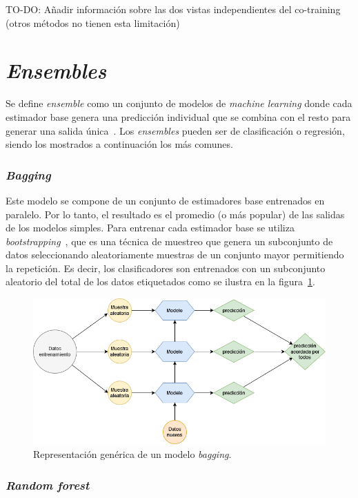 TO-DO: Añadir información sobre las dos vistas independientes del co-training (otros métodos no tienen esta limitación)


\section{\textit{Ensembles}}

Se define \textit{ensemble} como un conjunto de modelos de \textit{machine learning} donde cada estimador base genera una predicción individual que se combina con el resto para generar una salida única~\cite{originalCoForest2007}. Los \textit{ensembles} pueden ser de clasificación o regresión, siendo los mostrados a continuación los más comunes.
	
\subsubsection{\textit{Bagging}}

Este modelo se compone de un conjunto de estimadores base entrenados en paralelo. Por lo tanto, el resultado es el promedio (o más popular) de las salidas de los modelos simples. Para entrenar cada estimador base se utiliza \textit{bootstrapping}~\cite{engelen2018thesis}, que es una técnica de muestreo que genera un subconjunto de datos seleccionando aleatoriamente muestras de un conjunto mayor permitiendo la repetición. Es decir, los clasificadores son entrenados con un subconjunto aleatorio del total de los datos etiquetados como se ilustra en la figura~\ref{img:bagging}.

\begin{figure}[h]
	\caption{Representación genérica de un modelo \textit{bagging}.}
	\label{img:bagging}
	\centering
	\includegraphics[width=\textwidth]{../img/memoria/bagging}
\end{figure}

\subsubsection{\textit{Random forest}}

